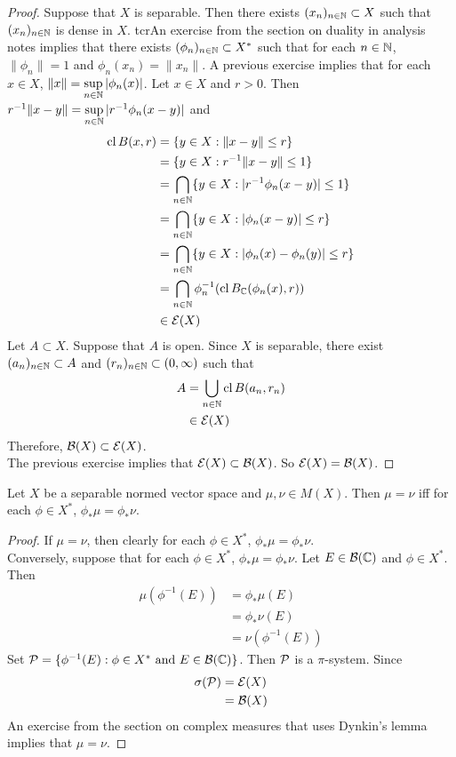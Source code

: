 \documentclass{book}
\begin{document}
\begin{proof}
	Suppose that $X$ is separable. Then there exists $(x_n)_{n \in \mathbb{N}} \subset X$ such that $(x_n)_{n \in \mathbb{N}}$ is dense in $X$. tcr{An exercise from the section on duality in analysis notes } implies that there exists $(\phi_n)_{n \in \mathbb{N}} \subset X^*$ such that for each $n \in \mathbb{N}$, $\|\phi_n\| = 1$ and $\phi_n(x_n) = \|x_n\|$. A previous exercise implies that for each $x \in X$, $\|x\| = \sup\limits_{n \in \mathbb{N}} |\phi_n(x)|$. Let $x \in X$ and $r > 0$. Then $r^{-1}\|x - y \| = \sup\limits_{n \in \mathbb{N}} |r^{-1}\phi_n(x - y)|$ and 
	\begin{align*}
		\operatorname{cl} B(x,r)
		& = \{y \in X: \|x -y \| \leq r\} \\
		& = \{y \in X: r^{-1}\|x - y \| \leq 1\} \\
		& = \bigcap_{n \in \mathbb{N}} \{y \in X: |r^{-1}\phi_n(x - y)| \leq 1\} \\
		& = \bigcap_{n \in \mathbb{N}} \{y \in X: |\phi_n(x - y)| \leq r\} \\ 
		& = \bigcap_{n \in \mathbb{N}} \{y \in X: |\phi_n(x) - \phi_n(y)| \leq r\} \\
		& = \bigcap_{n \in \mathbb{N}} \phi_n^{-1}(\operatorname{cl} B_{\mathbb{C}}(\phi_n (x), r)) \\
		& \in \mathcal{E}(X)
	\end{align*}
	Let $A \subset X$. Suppose that $A$ is open. Since $X$ is separable, there exist $(a_n)_{n \in \mathbb{N}} \subset A$ and $(r_n)_{n \in \mathbb{N}} \subset (0, \infty)$ such that 
	\begin{align*}
		A 
		& = \bigcup_{n \in \mathbb{N}} \operatorname{cl} B(a_n, r_n) \\
		& \in \mathcal{E}(X)
	\end{align*}
	Therefore, $\mathcal{B}(X) \subset \mathcal{E}(X)$. \\
	The previous exercise implies that $\mathcal{E}(X) \subset \mathcal{B}(X)$. So $\mathcal{E}(X) = \mathcal{B}(X)$.
\end{proof}

\begin{ex}
	Let $X$ be a separable normed vector space and $\mu, \nu \in M(X)$. Then $\mu = \nu$ iff for each $\phi \in X^*$, $\phi_*\mu = \phi_*\nu$.
\end{ex}

\begin{proof}
	If $\mu = \nu$, then clearly for each $\phi \in X^*$, $\phi_*\mu = \phi_*\nu$. \\
	Conversely, suppose that for each $\phi \in X^*$, $\phi_*\mu = \phi_*\nu$. Let $E \in \mathcal{B}(\mathbb{C})$ and $\phi \in X^*$. Then 
	\begin{align*}
		\mu(\phi^{-1}(E)) 
		& = \phi_*\mu(E) \\
		& = \phi_*\nu(E) \\
		&= \nu(\phi^{-1}(E))
	\end{align*}
	Set $\mathcal{P} = \{\phi^{-1}(E): \phi \in X^* \text{ and } E \in \mathcal{B}(\mathbb{C})\}$. Then $\mathcal{P}$ is a $\pi$-system. Since 
	\begin{align*}
		\sigma(\mathcal{P}) 
		& = \mathcal{E}(X) \\
		& = \mathcal{B}(X)
	\end{align*}
	An exercise from the section on complex measures that uses Dynkin's lemma implies that $\mu = \nu$.
\end{proof}
\end{document}
